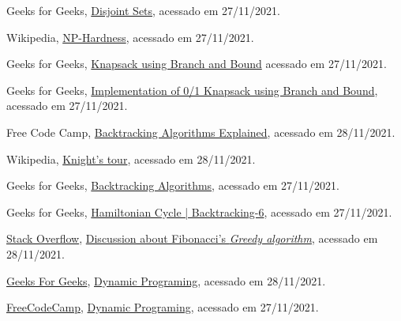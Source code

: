 \begin{thebibliography}{10}

  Geeks for Geeks,
  \href{https://www.geeksforgeeks.org/disjoint-set-data-structures/}{Disjoint Sets},
  acessado em 27/11/2021.

  Wikipedia,
  \href{https://en.wikipedia.org/wiki/NP-hardness}{NP-Hardness},
  acessado em 27/11/2021.
  
  Geeks for Geeks,
  \href{https://www.geeksforgeeks.org/0-1-knapsack-using-branch-and-bound/}{Knapsack using Branch and Bound}
  acessado em 27/11/2021.
  
  Geeks for Geeks,
  \href{https://www.geeksforgeeks.org/implementation-of-0-1-knapsack-using-branch-and-bound/}{Implementation of 0/1 Knapsack using Branch and Bound},
  acessado em 27/11/2021.
  
  Free Code Camp,
  \href{https://www.freecodecamp.org/news/backtracking-algorithms-explained/}{Backtracking Algorithms Explained},
  acessado em 28/11/2021.

  Wikipedia,
  \href{https://en.wikipedia.org/wiki/Knight%27s_tour}{Knight's tour},
  acessado em 28/11/2021.

  Geeks for Geeks,
  \href{https://www.geeksforgeeks.org/backtracking-algorithms/#standard}{Backtracking Algorithms},
  acessado em 27/11/2021.

  Geeks for Geeks,
  \href{https://www.geeksforgeeks.org/hamiltonian-cycle-backtracking-6/}{Hamiltonian Cycle | Backtracking-6},
  acessado em 27/11/2021.


  \href{https://stackoverflow.com/}{Stack Overflow},
  \href{https://stackoverflow.com/questions/52869474/implementing-fibonacci-series-using-greedy-approach}{Discussion about Fibonacci's \emph{Greedy algorithm}},
  acessado em 28/11/2021. 

  \href{https://www.geeksforgeeks.org/}{Geeks For Geeks},
  \href{https://www.geeksforgeeks.org/dynamic-programming/}{Dynamic Programing},
  acessado em 28/11/2021.
  
  \href{https://www.freecodecamp.org}{FreeCodeCamp},
  \href{https://youtu.be/oBt53YbR9Kk?t=210}{Dynamic Programing},
  acessado em 27/11/2021.


\end{thebibliography}

